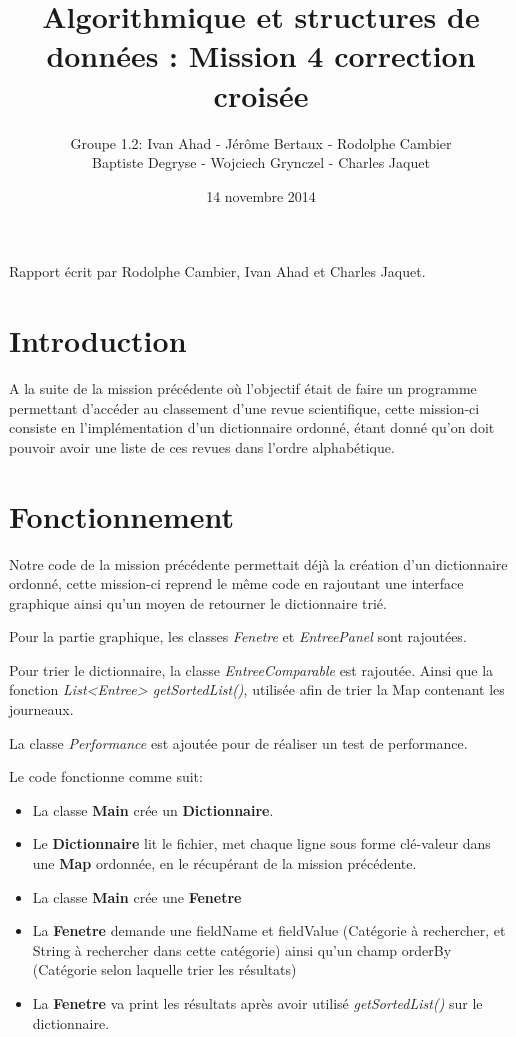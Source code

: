 \documentclass[a4paper]{article}
\title{Algorithmique et structures de données : Mission 4 correction croisée}
\date{14 novembre 2014}
\author{Groupe 1.2: Ivan Ahad - Jérôme Bertaux - Rodolphe Cambier \\ 
	Baptiste Degryse - Wojciech Grynczel - Charles Jaquet}
\begin{document}
\maketitle


Rapport écrit par Rodolphe Cambier, Ivan Ahad et Charles Jaquet.

\section*{Introduction}

A la suite de la mission précédente où l'objectif était de faire un programme permettant d'accéder au classement d'une revue scientifique, cette mission-ci consiste en l'implémentation d'un dictionnaire ordonné,  étant donné qu'on doit pouvoir avoir une liste de ces revues dans l'ordre alphabétique.


\section*{Fonctionnement}

Notre code de la mission précédente permettait déjà la création d'un dictionnaire ordonné, cette mission-ci reprend le même code en rajoutant une interface graphique ainsi qu'un moyen de retourner le dictionnaire trié.


Pour la partie graphique, les classes \textit{Fenetre} et \textit{EntreePanel} sont rajoutées.


Pour trier le dictionnaire, la classe \textit{EntreeComparable} est rajoutée. Ainsi que la fonction \textit{List<Entree> getSortedList()}, utilisée afin de trier la Map contenant les journeaux.


La classe \textit{Performance} est ajoutée pour de réaliser un test de performance.

Le code fonctionne comme suit:

\begin{itemize}
\item La classe \textbf{Main} crée un \textbf{Dictionnaire}.
\item Le \textbf{Dictionnaire} lit le fichier, met chaque ligne sous forme clé-valeur dans une \textbf{Map} ordonnée, en le récupérant de la mission précédente. 
\item La classe \textbf{Main} crée une \textbf{Fenetre}
\item La \textbf{Fenetre} demande une fieldName et fieldValue (Catégorie à rechercher, et String à rechercher dans cette catégorie) ainsi qu'un champ orderBy (Catégorie selon laquelle trier les résultats)
\item La \textbf{Fenetre} va print les résultats après avoir utilisé \textit{getSortedList()} sur le dictionnaire.
\end{itemize}
\end{document}
